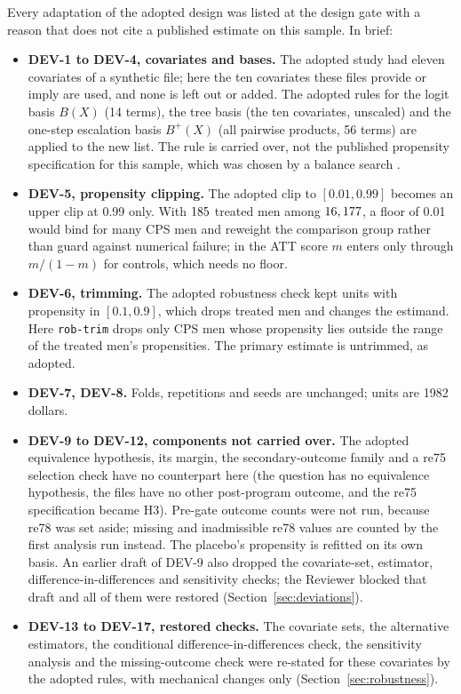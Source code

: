 \documentclass[11pt]{article}
\newcommand{\run}[1]{\texttt{#1}}
\begin{document}
Every adaptation of the adopted design was listed at the design gate with a reason that
does not cite a published estimate on this sample. In brief:
\begin{itemize}
  \setlength{\itemsep}{1pt}
  \item \textbf{DEV-1 to DEV-4, covariates and bases.} The adopted study had eleven
        covariates of a synthetic file; here the ten covariates these files provide or imply
        are used, and none is left out or added. The adopted rules for the logit basis
        $B(X)$ (14 terms), the tree basis (the ten covariates, unscaled) and the one-step
        escalation basis $B^{+}(X)$ (all pairwise products, 56 terms) are applied to the new
        list. The rule is carried over, not the published propensity specification for this
        sample, which was chosen by a balance search \citep{dehejia1999}.
  \item \textbf{DEV-5, propensity clipping.} The adopted clip to $[0.01, 0.99]$ becomes an
        upper clip at 0.99 only. With $185$ treated men among $16,177$, a floor
        of 0.01 would bind for many CPS men and reweight the comparison group rather than
        guard against numerical failure; in the ATT score $m$ enters only through
        $m/(1-m)$ for controls, which needs no floor.
  \item \textbf{DEV-6, trimming.} The adopted robustness check kept units with propensity in
        $[0.1, 0.9]$, which drops treated men and changes the estimand. Here \run{rob-trim}
        drops only CPS men whose propensity lies outside the range of the treated men's
        propensities. The primary estimate is untrimmed, as adopted.
  \item \textbf{DEV-7, DEV-8.} Folds, repetitions and seeds are unchanged; units are 1982
        dollars.
  \item \textbf{DEV-9 to DEV-12, components not carried over.} The adopted equivalence
        hypothesis, its margin, the secondary-outcome family and a re75 selection check have
        no counterpart here (the question has no equivalence hypothesis, the files have no
        other post-program outcome, and the re75 specification became H3). Pre-gate outcome
        counts were not run, because re78 was set aside; missing and inadmissible re78 values
        are counted by the first analysis run instead. The placebo's propensity is refitted on
        its own basis. An earlier draft of DEV-9 also dropped the covariate-set, estimator,
        difference-in-differences and sensitivity checks; the Reviewer blocked that draft and
        all of them were restored (Section~\ref{sec:deviations}).
  \item \textbf{DEV-13 to DEV-17, restored checks.} The covariate sets, the alternative
        estimators, the conditional difference-in-differences check, the sensitivity analysis
        and the missing-outcome check were re-stated for these covariates by the adopted
        rules, with mechanical changes only (Section~\ref{sec:robustness}).
\end{itemize}
\end{document}
